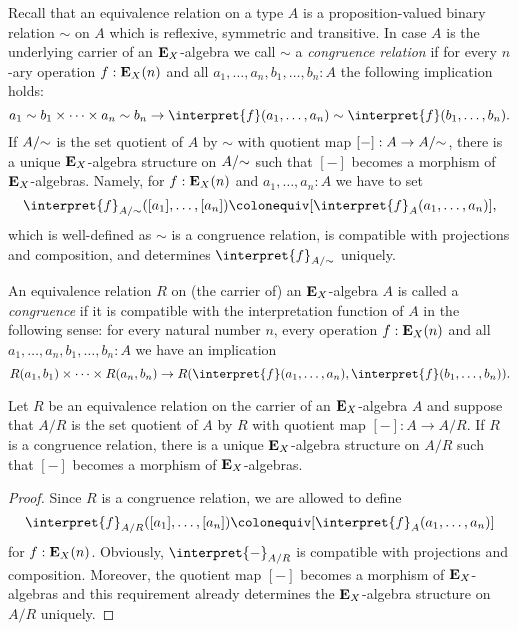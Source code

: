 {Recall that an equivalence relation on a type \(A\) is a proposition-valued binary relation \(\sim\) on \(A\) which is reflexive, symmetric and transitive.
In case \(A\) is the underlying carrier of an \(\mathbf{E}_X\)-algebra we call \(\sim\) a \emph{congruence relation} if for every \(n\)-ary operation \(f:\mathbf{E}_X(n)\) and all \(a_1,\dots,a_n,b_1,\dots,b_n : A\) the following implication holds:
\[
  a_1 \sim b_1 \times \dots\times a_n \sim b_n \to \interpret{f}(a_1,\dots,a_n) \sim \interpret{f}(b_1,\dots,b_n).
\]
If \({A}/{\sim}\) is the set quotient of \(A\) by \(\sim\) with quotient map \([-]:A \to {A}/{\sim}\), there is a unique \(\mathbf{E}_X\)-algebra structure on \({A}/{\sim}\) such that \([-]\) becomes a morphism of \(\mathbf{E}_X\)-algebras.
Namely, for \(f:\mathbf{E}_X(n)\) and \(a_1,\dots,a_n:A\) we have to set
\[
  \interpret{f}_{\quotient{A}{\sim}}([a_1],\dots,[a_n]) \colonequiv [\interpret{f}_A(a_1,\dots,a_n)],
\]
which is well-defined as \(\sim\) is a congruence relation, is compatible with projections and composition, and determines \(\interpret{f}_{\quotient{A}{\sim}}\) uniquely.


\begin{definition}
  An equivalence relation \(R\) on (the carrier of) an \(\mathbf{E}_X\)-algebra \(A\) is called a \emph{congruence} if it is compatible with the interpretation function of \(A\) in the following sense:
  for every natural number \(n\), every operation \(f:\mathbf{E}_X(n)\) and all \(a_1,\dots,a_n,b_1,\dots,b_n : A\) we have an implication
  \[
    R(a_1,b_1) \times \dots\times R(a_n,b_n) \to R(\interpret{f}(a_1,\dots,a_n),\interpret{f}(b_1,\dots,b_n)).
  \]
\end{definition}

\begin{lemma}
  Let \(R\) be an equivalence relation on the carrier of an \(\mathbf{E}_X\)-algebra \(A\) and suppose that \(A/R\) is the set quotient of \(A\) by \(R\) with quotient map \([-]:A \to A/R\).
  If \(R\) is a congruence relation, there is a unique \(\mathbf{E}_X\)-algebra structure on \(A/R\) such that \([-]\) becomes a morphism of \(\mathbf{E}_X\)-algebras.
\end{lemma}
\begin{proof}
  Since \(R\) is a congruence relation, we are allowed to define
  \[
    \interpret{f}_{A/R}([a_1],\dots,[a_n]) \colonequiv [\interpret{f}_A(a_1,\dots,a_n)]
  \]
  for \(f:\mathbf{E}_X(n)\).
  Obviously, \(\interpret{-}_{A/R}\) is compatible with projections and composition.
  Moreover, the quotient map \([-]\) becomes a morphism of \(\mathbf{E}_X\)-algebras and this requirement already determines the \(\mathbf{E}_X\)-algebra structure on \(A/R\) uniquely.
\end{proof}

}
